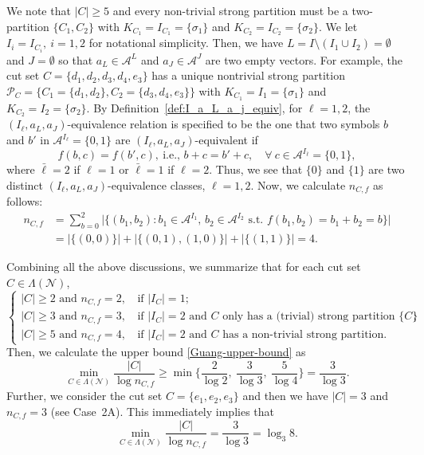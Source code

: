 \documentclass[11pt,draftclsnofoot,onecolumn]{IEEEtran}
\begin{document}
  We note that $|C|\geq 5$ and every non-trivial strong partition must be a two-partition $\{C_{1},C_{2}\}$ with $K_{C_1}= I_{C_{1}}=\{\sigma_{1}\}$ and $K_{C_2}= I_{C_{2}}=\{\sigma_{2}\}$.
  We let $I_i=I_{C_i},~i=1,2$ for notational simplicity.
Then, we  have $L=I\setminus(I_{1}\cup I_{2})=\emptyset$ and $J=\emptyset$ so that $a_{L}\in\mathcal{A}^L$ and $a_{J}\in\mathcal{A}^J$ are two empty vectors. For example, the cut set  $C=\{d_{1},d_{2},d_{3},d_{4},e_{3}\}$  has a
unique nontrivial strong partition $\mathcal{P}_{C}=\big\{C_{1}=\{d_{1},d_{2}\},C_{2}=\{d_{3},d_{4},e_{3}\}\big\}$ with $K_{C_1}=I_{1}=\{\sigma_{1}\}$ and $K_{C_2}=I_{2}=\{\sigma_{2}\}$.
By Definition~\ref{def:I_a_L_a_j_equiv}, for $\ell=1,2$,  the $(I_{\ell},a_{L},a_{J})$-equivalence relation is specified to be the one that  two symbols $b$ and $b'$ in $\mathcal{A}^{I_{\ell}}=\{0,1\}$ are $(I_{\ell},a_{L},a_{J})$-equivalent if
\begin{equation*}
f(b,c)=f(b',c),~\text{i.e., $b+c=b'+c$},\quad\forall~c\in \mathcal{A}^{I_{\bar{\ell}}}=\{0,1\},
\end{equation*}
where  $\bar{\ell}=2$ if $\ell=1$ or $\bar{\ell}=1$ if $\ell=2$.
Thus, we   see that $\{0\}$ and $\{1\}$ are two distinct $(I_{\ell},a_{L},a_{J})$-equivalence classes, $\ell=1,2$.
Now, we calculate $n_{C,f}$ as follows:
\begin{align*}
n_{C,f}&=\sum_{b=0}^{2}\big|\big\{(b_{1},b_{2}):\text{$b_{1}\in\mathcal{A}^{I_{1}}$, $b_{2}\in\mathcal{A}^{I_{2}}$ s.t. $f(b_{1},b_{2})=b_1+b_2=b$}\big\}\big|\\
&=\big|\big\{(0,0)\big\}\big|+\big|\big\{(0,1),(1,0)\big\}\big|+\big|\big\{(1,1)\big\}\big|=4.
\end{align*}



Combining all the above discussions, we summarize  that for each cut set $C\in\Lambda(\mathcal{N})$,
\begin{equation*}
  \begin{cases}
    \text{$|C|\geq 2$ and $n_{C,f}=2$, } & \text{if $|I_C|=1$}; \\
    \text{$|C|\geq 3$ and $n_{C,f}=3$, } & \text{if $|I_C|=2$ and $C$ only has  a (trivial) strong partition $\{C\}$};\\
    \text{$|C|\geq 5$ and $n_{C,f}=4$, } & \text{if $|I_C|=2$ and $C$ has  a non-trivial strong partition}.
  \end{cases}\label{eq:3-classes-cut}
\end{equation*}
Then, we calculate the upper bound \eqref{Guang-upper-bound} as
\begin{equation*}
\min_{C\in\Lambda(\mathcal{N})}\frac{|C|}{\log n_{C,f}}\geq\min\bigg\{\frac{2}{\log 2},~\frac{3}{\log 3},~\frac{5}{\log 4}\bigg\}=\frac{3}{\log 3}.
\end{equation*}
Further, we consider the  cut set $C=\{e_{1},e_{2},e_{3}\}$  and
 then we have $|C|=3$ and $n_{C,f}=3$ (see Case~2A).
 This immediately implies  that
\begin{equation*}
\min_{C\in\Lambda(\mathcal{N})}\frac{|C|}{\log n_{C,f}}=\frac{3}{\log 3}=\log_{3}8.\label{Guang-upper-bound-value}
\end{equation*}
\end{document}
